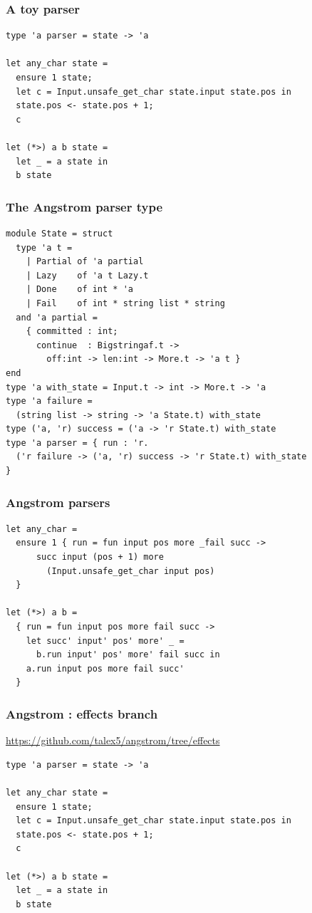 \documentclass{beamer}
\begin{document}
\begin{frame}[fragile]
	\frametitle{A toy parser}
\begin{lstlisting}[style=ocaml]
type 'a parser = state -> 'a

let any_char state =
  ensure 1 state;
  let c = Input.unsafe_get_char state.input state.pos in
  state.pos <- state.pos + 1;
  c

let (*>) a b state =
  let _ = a state in
  b state
\end{lstlisting}
\end{frame}

\begin{frame}[fragile]
	\frametitle{The Angstrom parser type}
\begin{lstlisting}[style=ocaml,basicstyle=\ttfamily\small]
module State = struct
  type 'a t =
    | Partial of 'a partial
    | Lazy    of 'a t Lazy.t
    | Done    of int * 'a
    | Fail    of int * string list * string
  and 'a partial =
    { committed : int;
      continue  : Bigstringaf.t ->
        off:int -> len:int -> More.t -> 'a t }
end
type 'a with_state = Input.t -> int -> More.t -> 'a
type 'a failure =
  (string list -> string -> 'a State.t) with_state
type ('a, 'r) success = ('a -> 'r State.t) with_state
type 'a parser = { run : 'r.
  ('r failure -> ('a, 'r) success -> 'r State.t) with_state
}
\end{lstlisting}
\end{frame}

\begin{frame}[fragile]
	\frametitle{Angstrom parsers}
\begin{lstlisting}[style=ocaml,basicstyle=\ttfamily\small]
let any_char =
  ensure 1 { run = fun input pos more _fail succ ->
      succ input (pos + 1) more
        (Input.unsafe_get_char input pos)
  }

let (*>) a b =
  { run = fun input pos more fail succ ->
    let succ' input' pos' more' _ =
      b.run input' pos' more' fail succ in
    a.run input pos more fail succ'
  }
\end{lstlisting}
\end{frame}

\begin{frame}[fragile]
	\frametitle{Angstrom : effects branch}
\url{https://github.com/talex5/angstrom/tree/effects}
\bigskip
\begin{lstlisting}[style=ocaml]
type 'a parser = state -> 'a

let any_char state =
  ensure 1 state;
  let c = Input.unsafe_get_char state.input state.pos in
  state.pos <- state.pos + 1;
  c

let (*>) a b state =
  let _ = a state in
  b state
\end{lstlisting}
\end{frame}
\end{document}
